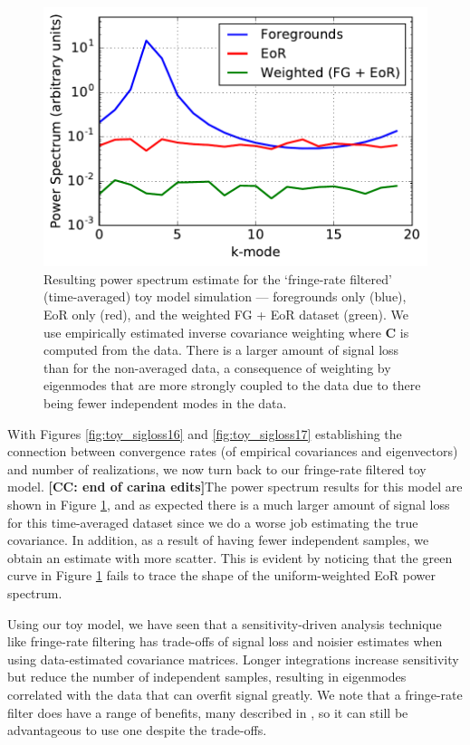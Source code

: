 \documentclass[preprint2,numberedappendix,tighten]{aastex6}  %
\newcommand{\cc}[1]{{\color{purple} \textbf{[CC: #1]}}}
\begin{document}
\begin{figure}
	\centering
	\includegraphics[trim={0cm 0cm 0cm 0cm},clip,width=\columnwidth]{plots/toy_sigloss7.pdf}
	\caption{Resulting power spectrum estimate for the `fringe-rate filtered' (time-averaged) toy model simulation --- foregrounds only (blue), 
EoR only (red), and the weighted FG + EoR dataset (green). We use empirically estimated inverse covariance weighting where $\textbf{C}$ is 
computed from the data. There is a larger amount of signal loss than for the non-averaged data, a consequence of weighting by eigenmodes that are more strongly coupled to the data due to there being fewer independent modes in the data.}
	\label{fig:toy_sigloss7}
\end{figure}


With Figures \ref{fig:toy_sigloss16} and \ref{fig:toy_sigloss17} establishing the connection between convergence rates (of empirical covariances and eigenvectors) and number of realizations, we now turn back to our fringe-rate filtered toy model. \cc{end of carina edits}The power spectrum results for this model are shown in Figure \ref{fig:toy_sigloss7}, and as 
expected there is a much larger amount of signal loss for this time-averaged dataset since we do a worse job estimating the true covariance. In addition, as a result of having fewer independent samples, we obtain an estimate with more scatter. This is evident by noticing that the 
green curve in Figure \ref{fig:toy_sigloss7} fails to trace the shape of the uniform-weighted EoR power spectrum.

Using our toy model, we have seen that a sensitivity-driven analysis technique like fringe-rate filtering has trade-offs of signal 
loss and noisier estimates when using data-estimated covariance matrices. Longer integrations increase sensitivity but reduce 
the number of independent samples, resulting in 
eigenmodes correlated with the data
that can overfit signal greatly. We 
note that a fringe-rate filter does have a range of benefits, many described in \citet{parsons_et_al2016}, so it can still be 
advantageous to use one despite the trade-offs.
\end{document}
